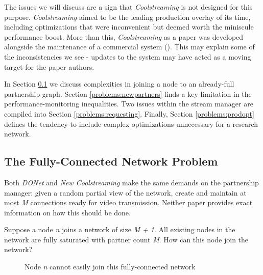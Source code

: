 \documentclass[12pt,a4paper]{article}
\begin{document}
The issues we will discuss are a sign that \textit{Coolstreaming} is not designed for this purpose. \textit{Coolstreaming} aimed to be the leading production overlay of its time, including optimizations that were inconvenient but deemed worth the miniscule performance boost. More than this, \textit{Coolstreaming} as a paper was developed alongside the maintenance of a commercial system (\cite{Li2007}). This may explain some of the inconsistencies we see - updates to the system may have acted as a moving target for the paper authors.

In Section \ref{problems:fcn} we discuss complexities in joining a node to an already-full partnership graph. Section \ref{problems:newpartners} finds a key limitation in the performance-monitoring inequalities. Two issues within the stream manager are compiled into Section \ref{problems:requesting}. Finally, Section \ref{problems:prodopt} defines the tendency to include complex optimizations unnecessary for a research network.

\subsection{The Fully-Connected Network Problem} \label{problems:fcn}
Both \textit{DONet} and \textit{New Coolstreaming} make the same demands on the partnership manager: given a random partial view of the network, create and maintain at most \textit{M} connections ready for video transmission. Neither paper provides exact information on how this should be done.

Suppose a node \textit{n} joins a network of size \textit{M + 1}. All existing nodes in the network are fully saturated with partner count \textit{M}. How can this node join the network?

\begin{figure}[!ht]
	\centering
	\caption{Node \textit{n} cannot easily join this fully-connected network}
	\label{fig1}
\end{figure}
\end{document}
